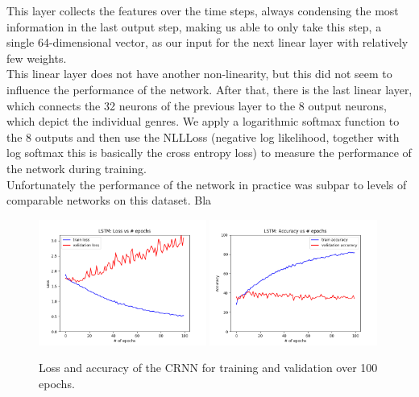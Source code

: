     This layer collects the features over the time steps, always condensing the most information in the last output step, making us able to only take this step, a single 64-dimensional vector, as our input for the next linear layer with relatively few weights.\\
    This linear layer does not have another non-linearity, but this did not seem to influence the performance of the network.
    After that, there is the last linear layer, which connects the 32 neurons of the previous layer to the 8 output neurons, which depict the individual genres.
    We apply a logarithmic softmax function to the 8 outputs and then use the NLLLoss (negative log likelihood, together with log softmax this is basically the cross entropy loss) to measure the performance of the network during training.\\
    Unfortunately the performance of the network in practice was subpar to levels of comparable networks on this dataset.
    Bla
    \\

    \begin{figure}[b]
        \centering
        \includegraphics[width=0.49\textwidth]{images/loss}
        \includegraphics[width=0.49\textwidth]{images/acc}
        \caption{Loss and accuracy of the CRNN for training and validation over 100 epochs.}
    \end{figure}